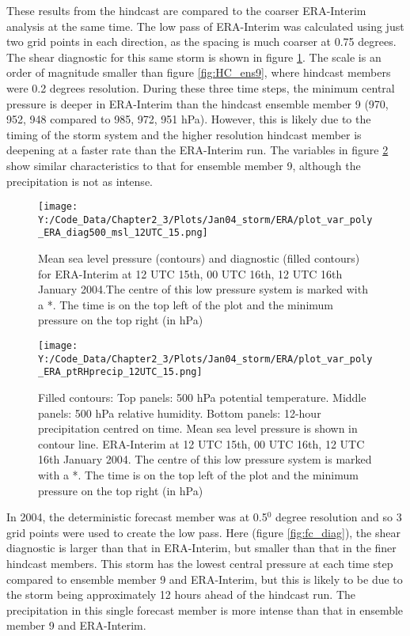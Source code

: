These results from the hindcast are compared to the coarser ERA-Interim analysis at the same time. The low pass of ERA-Interim was calculated using just two grid points in each direction, as the spacing is much coarser at 0.75 degrees. The shear diagnostic for this same storm is shown in figure \ref{fig:ERA_diag}. The scale is an order of magnitude smaller than figure \ref{fig:HC_ens9}, where hindcast members were 0.2 degrees resolution. During these three time steps, the minimum central pressure is deeper in ERA-Interim than the hindcast ensemble member 9 (970, 952, 948 compared to 985, 972, 951 hPa). However, this is likely due to the timing of the storm system and the higher resolution hindcast member is deepening at a faster rate than the ERA-Interim run. The variables in figure \ref{fig:ERA_pt_RH_precip} show similar characteristics to that for ensemble member 9, although the precipitation is not as intense.


\begin{figure}
	\texttt{[image: Y:/Code\_Data/Chapter2\_3/Plots/Jan04\_storm/ERA/plot\_var\_poly\_ERA\_diag500\_msl\_12UTC\_15.png]}
	\caption{Mean sea level pressure (contours) and diagnostic (filled contours) for ERA-Interim at 12 UTC 15th, 00 UTC 16th, 12 UTC 16th January 2004.The centre of this low pressure system is marked with a *. The time is on the top left of the plot and the minimum pressure on the top right (in hPa)}\label{fig:ERA_diag}
	\centering
\end{figure}

\begin{figure}	%
	\texttt{[image: Y:/Code\_Data/Chapter2\_3/Plots/Jan04\_storm/ERA/plot\_var\_poly\_ERA\_ptRHprecip\_12UTC\_15.png]}
	\caption{Filled contours: Top panels: 500 hPa potential temperature. Middle panels: 500 hPa relative humidity. Bottom panels: 12-hour precipitation centred on time. Mean sea level pressure is shown in contour line. ERA-Interim at 12 UTC 15th, 00 UTC 16th, 12 UTC 16th January 2004. The centre of this low pressure system is marked with a *. The time is on the top left of the plot and the minimum pressure on the top right (in hPa)}\label{fig:ERA_pt_RH_precip}
	\centering
\end{figure}

In 2004, the deterministic forecast member was at 0.5$^0$ degree resolution and so 3 grid points were used to create the low pass. Here (figure \ref{fig:fc_diag}), the shear diagnostic is larger than that in ERA-Interim, but smaller than that in the finer hindcast members. This storm has the lowest central pressure at each time step compared to ensemble member 9 and ERA-Interim, but this is likely to be due to the storm being approximately 12 hours ahead of the hindcast run. The precipitation in this single forecast member is more intense than that in ensemble member 9 and ERA-Interim.

